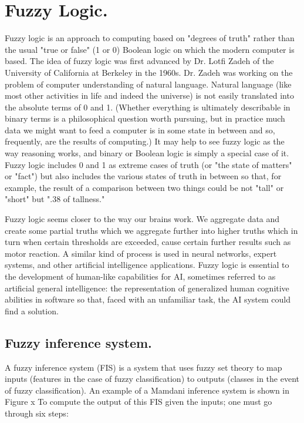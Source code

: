 \section{Fuzzy Logic.}

Fuzzy logic is an approach to computing based on "degrees of truth" rather than
the usual "true or false" (1 or 0) Boolean logic on which the modern computer is
based.  The idea of fuzzy logic was first advanced by Dr. Lotfi Zadeh of the
University of California at Berkeley in the 1960s. Dr. Zadeh was working on the
problem of computer understanding of natural language. Natural language (like
most other activities in life and indeed the universe) is not easily translated
into the absolute terms of 0 and 1. (Whether everything is ultimately
describable in binary terms is a philosophical question worth pursuing, but in
practice much data we might want to feed a computer is in some state in between
and so, frequently, are the results of computing.) It may help to see fuzzy
logic as the way reasoning works, and binary or Boolean logic is simply a
special case of it. Fuzzy logic includes 0 and 1 as extreme cases of truth (or
"the state of matters" or "fact") but also includes the various states of truth
in between so that, for example, the result of a comparison between two things
could be not "tall" or "short" but ".38 of tallness."

Fuzzy logic seems closer to the way our brains work. We aggregate data and
create some partial truths which we aggregate further into higher truths which
in turn when certain thresholds are exceeded, cause certain further results such
as motor reaction. A similar kind of process is used in neural networks, expert
systems, and other artificial intelligence applications. Fuzzy logic is
essential to the development of human-like capabilities for AI, sometimes
referred to as artificial general intelligence: the representation of
generalized human cognitive abilities in software so that, faced with an
unfamiliar task, the AI system could find a solution.

\subsection{Fuzzy inference system.} 

A fuzzy inference system (FIS) is a system that uses fuzzy set theory to map
inputs (features in the case of fuzzy classification) to outputs (classes in the
event of fuzzy classification).  An example of a Mamdani inference system is
shown in Figure x To compute the output of this FIS given the inputs; one must
go through six steps:

